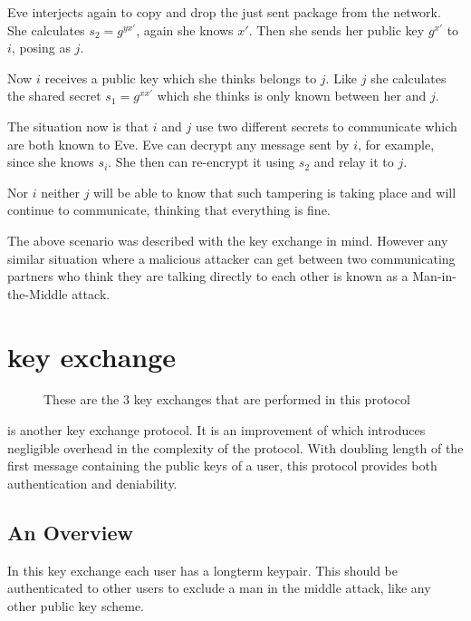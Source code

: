 Eve interjects again to copy and drop the just sent package from the network.
She calculates $s_2 = g^{yx\prime}$, again she knows $x\prime$.
Then she sends her public key $g^{x\prime}$ to $i$, posing as $j$.

Now $i$ receives a public key which she thinks belongs to $j$.
Like $j$ she calculates the shared secret $s_1 = g^{xx\prime}$ which she thinks is only known between her and $j$.

The situation now is that $i$ and $j$ use two different secrets to communicate which are both known to Eve.
Eve can decrypt any message sent by $i$, for example, since she knows $s_i$.
She then can re-encrypt it using $s_2$ and relay it to $j$.

Nor $i$ neither $j$ will be able to know that such tampering is taking place and will continue to communicate, thinking that everything is fine.

The above scenario was described with the \dhname key exchange in mind.
However any similar situation where a malicious attacker can get between two communicating partners who think they are talking directly to each other is known as a Man-in-the-Middle attack.

\section{\tdhname key exchange}
\begin{figure}[h]
\begin{centering}
  
  \caption[\tdhname in a picture]{These are the 3 \dhname key exchanges that are performed in this protocol}
\end{centering}
\end{figure}

\tdhname is another key exchange protocol.
It is an improvement of \dhname which introduces negligible overhead in the complexity of the protocol.
With doubling length of the first message containing the public keys of a user, this protocol provides both authentication and deniability.

\subsection{An Overview}

In this key exchange each user has a \dhname longterm keypair.
This should be authenticated to other users to exclude a man in the middle attack, like any other public key scheme.

